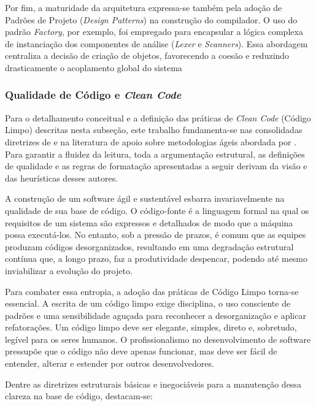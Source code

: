 Por fim, a maturidade da arquitetura expressa-se também pela adoção de Padrões de Projeto (\textit{Design Patterns}) na construção do compilador. O uso do padrão \textit{Factory}, por exemplo, foi empregado para encapsular a lógica complexa de instanciação dos componentes de análise (\textit{Lexer} e \textit{Scanners}). Essa abordagem centraliza a decisão de criação de objetos, favorecendo a coesão e reduzindo drasticamente o acoplamento global do sistema %

\subsubsection{Qualidade de Código e \textit{Clean Code}}

Para o detalhamento conceitual e a definição das práticas de \textit{Clean Code} (Código Limpo) descritas nesta subseção, este trabalho fundamenta-se nas consolidadas diretrizes de  e na literatura de apoio sobre metodologias ágeis abordada por . Para garantir a fluidez da leitura, toda a argumentação estrutural, as definições de qualidade e as regras de formatação apresentadas a seguir derivam da visão e das heurísticas desses autores. %

A construção de um software ágil e sustentável esbarra invariavelmente na qualidade de sua base de código. O código-fonte é a linguagem formal na qual os requisitos de um sistema são expressos e detalhados de modo que a máquina possa executá-los. No entanto, sob a pressão de prazos, é comum que as equipes produzam códigos desorganizados, resultando em uma degradação estrutural contínua que, a longo prazo, faz a produtividade despencar, podendo até mesmo inviabilizar a evolução do projeto. %

Para combater essa entropia, a adoção das práticas de Código Limpo torna-se essencial. A escrita de um código limpo exige disciplina, o uso consciente de padrões e uma sensibilidade aguçada para reconhecer a desorganização e aplicar refatorações. Um código limpo deve ser elegante, simples, direto e, sobretudo, legível para os seres humanos. O profissionalismo no desenvolvimento de software pressupõe que o código não deve apenas funcionar, mas deve ser fácil de entender, alterar e estender por outros desenvolvedores. %

Dentre as diretrizes estruturais básicas e inegociáveis para a manutenção dessa clareza na base de código, destacam-se: %

